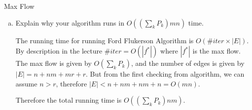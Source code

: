 \documentclass{article}
\numberwithin{table}{section}
\numberwithin{figure}{section}
\begin{document}
\begin{section}{Max Flow}
\begin{enumerate}[(a)]
    \item Explain why your algorithm runs in $O ((\sum_k P_k) mn)$ time.
    \begin{tcolorbox}
        The running time for running Ford Flukerson Algorithm is $O(\#iter \times |E|)$. By description in the lecture $\#iter = O(|f^*|)$ where $|f^*|$ is the max flow. The max flow is given by $O(\sum_k P_k)$, and the number of edges is given by $|E| = n + nm + mr + r$. But from the first checking from algorithm, we can assume $n > r$, therefore $|E| < n + nm +nm + n = O(mn)$. 
        
        Therefore the total running time is $O((\sum_k P_k) nm)$.
    \end{tcolorbox}
\end{enumerate}
\end{section}
\end{document}
